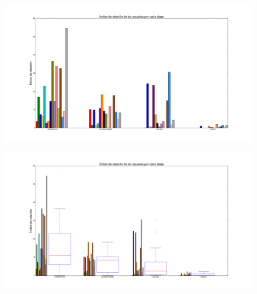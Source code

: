 \documentclass{beamer}
\begin{document}
\begin{frame}

\begin{figure}[h]
 \centering
  \begin{minipage}[c]{1\textwidth}
	\centering	
	\includegraphics[scale=0.23]{ir_uxc.png}
  \end{minipage}
\end{figure}

\end{frame}
\begin{frame}

\begin{figure}[h]
 \centering
  \begin{minipage}[c]{1\textwidth}
	\centering	
	\includegraphics[scale=0.23]{ir_uxc_2.png}
  \end{minipage}
\end{figure}

\end{frame}
\end{document}
